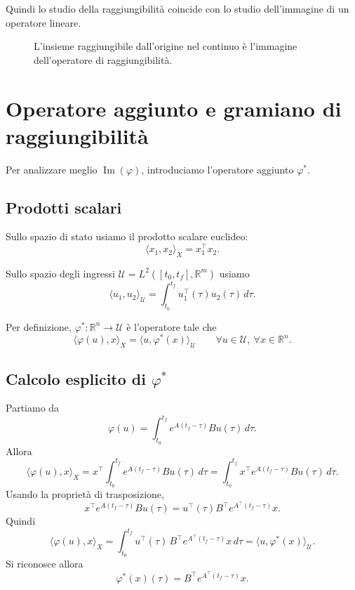 Quindi lo studio della raggiungibilità coincide con lo studio dell’immagine di un operatore lineare.

\begin{figure}[H]
\centering
{}
\caption{L’insieme raggiungibile dall’origine nel continuo è l’immagine dell’operatore di raggiungibilità.}
\label{fig:L11_phi}
\end{figure}

\section{Operatore aggiunto e gramiano di raggiungibilità}

Per analizzare meglio \(\operatorname{Im}(\varphi)\), introduciamo l’operatore aggiunto \(\varphi^\ast\).

\subsection{Prodotti scalari}

Sullo spazio di stato usiamo il prodotto scalare euclideo:
\[
\langle x_1,x_2\rangle_X=x_1^\top x_2.
\]

Sullo spazio degli ingressi \(\mathcal U=L^2([t_0,t_f],\mathbb{R}^m)\) usiamo
\[
\langle u_1,u_2\rangle_{\mathcal U}
=
\int_{t_0}^{t_f} u_1^\top(\tau)u_2(\tau)\,d\tau.
\]

Per definizione, \(\varphi^\ast:\mathbb{R}^n\to\mathcal U\) è l’operatore tale che
\[
\langle \varphi(u),x\rangle_X
=
\langle u,\varphi^\ast(x)\rangle_{\mathcal U}
\qquad
\forall u\in\mathcal U,\ \forall x\in\mathbb{R}^n.
\]

\subsection{Calcolo esplicito di \(\varphi^\ast\)}

Partiamo da
\[
\varphi(u)=\int_{t_0}^{t_f} e^{A(t_f-\tau)}Bu(\tau)\,d\tau.
\]
Allora
\[
\langle \varphi(u),x\rangle_X
=
x^\top\int_{t_0}^{t_f} e^{A(t_f-\tau)}Bu(\tau)\,d\tau
=
\int_{t_0}^{t_f} x^\top e^{A(t_f-\tau)}Bu(\tau)\,d\tau.
\]
Usando la proprietà di trasposizione,
\[
x^\top e^{A(t_f-\tau)}Bu(\tau)
=
u^\top(\tau)B^\top e^{A^\top(t_f-\tau)}x.
\]
Quindi
\[
\langle \varphi(u),x\rangle_X
=
\int_{t_0}^{t_f}
u^\top(\tau)\,B^\top e^{A^\top(t_f-\tau)}x\,d\tau
=
\langle u,\varphi^\ast(x)\rangle_{\mathcal U}.
\]
Si riconosce allora
\begin{equation}
\varphi^\ast(x)(\tau)=B^\top e^{A^\top(t_f-\tau)}x.
\label{eq:L11_phi_star}
\end{equation}

